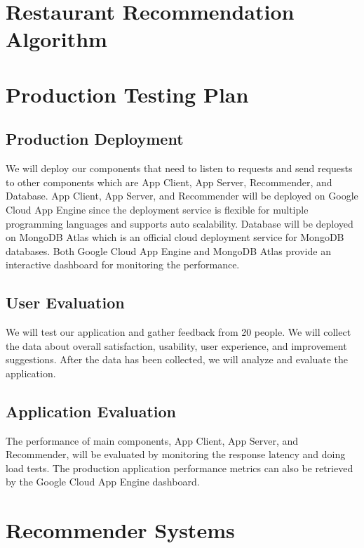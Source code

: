\documentclass[12pt,oneside,openright,a4paper]{cpe-english-project}
\begin{document}
\section{Restaurant Recommendation Algorithm}

\section{Production Testing Plan}

\subsection{Production Deployment}

We will deploy our components that need to listen to requests and send requests to other components which are App Client, App Server, Recommender, and Database. App Client, App Server, and Recommender will be deployed on Google Cloud App Engine since the deployment service is flexible for multiple programming languages and supports auto scalability. Database will be deployed on MongoDB Atlas which is an official cloud deployment service for MongoDB databases. Both Google Cloud App Engine and MongoDB Atlas provide an interactive dashboard for monitoring the performance.

\subsection{User Evaluation}

We will test our application and gather feedback from 20 people. We will collect the data about overall satisfaction, usability, user experience, and improvement suggestions. After the data has been collected, we will analyze and evaluate the application.

\subsection{Application Evaluation}

The performance of main components, App Client, App Server, and Recommender, will be evaluated by monitoring the response latency and doing load tests. The production application performance metrics can also be retrieved by the Google Cloud App Engine dashboard.



\section{Recommender Systems}
\end{document}
